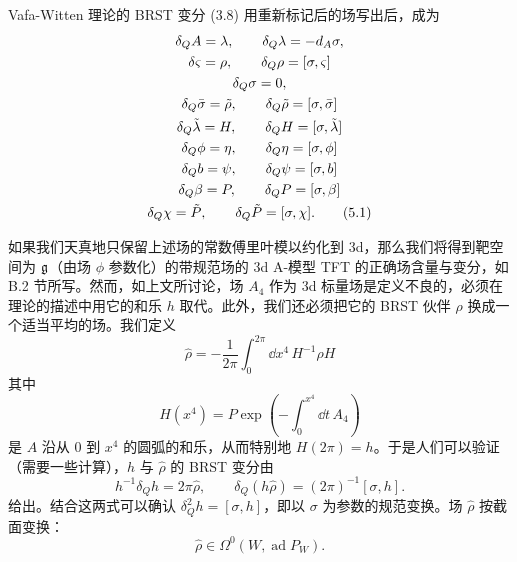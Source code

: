 Vafa-Witten 理论的 BRST 变分 (3.8) 用重新标记后的场写出后，成为
\begin{gather}
    \delta_QA = \lambda, \qquad \delta_Q\lambda = -d_A\sigma, \notag\\
    \delta\varsigma = \rho, \qquad \delta_Q\rho = [\sigma,\varsigma] \notag\\
    \delta_Q\sigma = 0, \notag\\
    \delta_Q\bar\sigma = \tilde\rho, \qquad \delta_Q\tilde\rho = [\sigma,\bar\sigma] \notag\\
    \delta_Q\tilde\lambda = H, \qquad \delta_QH = [\sigma,\tilde\lambda] \notag\\
    \delta_Q\phi = \eta, \qquad \delta_Q\eta = [\sigma,\phi] \notag\\
    \delta_Qb = \psi, \qquad \delta_Q\psi = [\sigma,b] \notag\\
    \delta_Q\beta = P, \qquad \delta_QP = [\sigma,\beta] \notag\\
    \delta_Q\chi = \tilde P, \qquad \delta_Q\tilde P = [\sigma,\chi] . \tag{5.1}
\end{gather}


如果我们天真地只保留上述场的常数傅里叶模以约化到 3d，那么我们将得到靶空间为 $\mathfrak{g}$（由场 $\phi$ 参数化）的带规范场的 3d A-模型 TFT 的正确场含量与变分，如 B.2 节所写。然而，如上文所讨论，场 $A_4$ 作为 3d 标量场是定义不良的，必须在理论的描述中用它的和乐 $h$ 取代。此外，我们还必须把它的 BRST 伙伴 $\rho$ 换成一个适当平均的场。我们定义
\[
    \hat\rho = -\frac{1}{2\pi}\int_0^{2\pi}\dd x^4\, H^{-1}\rho H
\]
其中
\[
    H(x^4) = P\exp\left(-\int_0^{x^4}\dd t\, A_4\right)
\]
是 $A$ 沿从 $0$ 到 $x^4$ 的圆弧的和乐，从而特别地 $H(2\pi)=h$。于是人们可以验证（需要一些计算），$h$ 与 $\hat\rho$ 的 BRST 变分由
\[
    h^{-1}\delta_Qh = 2\pi\hat\rho, \qquad
    \delta_Q(h\hat\rho) = (2\pi)^{-1}[\sigma,h] .
\]
给出。结合这两式可以确认 $\delta_Q^2h=[\sigma,h]$，即以 $\sigma$ 为参数的规范变换。场 $\hat\rho$ 按截面变换：
\[
    \hat\rho \in \Omega^0(W, \operatorname{ad} P_W) .
\]
